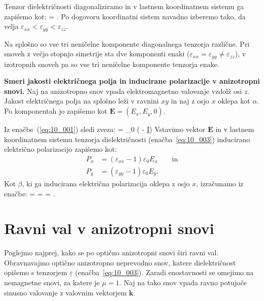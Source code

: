 Tenzor dielektričnosti diagonaliziramo in v lastnem koordinatnem 
sistemu ga zapišemo kot:
\beq
\underline{\varepsilon} = 
\!\!.
\label{eq:10_003}
\eeq
Po dogovoru koordinatni sistem navadno izberemo tako, da velja 
$\varepsilon_{xx}<\varepsilon_{yy}<\varepsilon_{zz}$.

Na splošno so vse tri neničelne komponente diagonalnega tenzorja različne. 
Pri snoveh z večjo stopnjo simetrije sta dve komponenti enaki ($\varepsilon_{xx} = 
\varepsilon_{yy} \neq \varepsilon_{zz}$), v izotropnih snoveh pa so vse tri 
neničelne komponente tenzorja enake. 

\begin{example}{\bf Smeri jakosti električnega polja 
in inducirane polarizacije v anizotropni snovi.}
Naj na anizotropno snov vpada elektromagnetno valovanje vzdolž osi $z$. Jakost
električnega polja na splošno leži v ravnini $xy$ in naj z osjo $x$ oklepa kot $\alpha$. 
Po komponentah jo zapišemo kot $\mathbf{E} = (E_x, E_y, 0)$. 

Iz enačbe~(\ref{eq:10_001}) sledi zveza:
\beq
{} = \varepsilon_0 \left(\underline{\varepsilon} - \underline{I}\right)
\label{eq:10_004}
\eeq
Vstavimo vektor $\mathbf{E}$ in v lastnem koordinatnem sistemu tenzorja 
dielektričnosti (enačba~\ref{eq:10_003}) inducirano električno polarizacijo zapišemo kot:
\begin{align}
P_x &= (\varepsilon_{xx}-1) \varepsilon_0 E_x \qquad \mathrm{in} \label{eq:10_005}\\
P_y &= (\varepsilon_{yy}-1) \varepsilon_0 E_y.
\label{eq:10_006}
\end{align}
Kot $\beta$, ki ga inducirana električna polarizacija oklepa z osjo $x$, izračunamo iz enačbe:
\beq
\tan \beta =  = 
 = \tan \alpha.
\eeq
\end{example}

\section{Ravni val v anizotropni snovi}
Poglejmo najprej, kako se po optično anizotropni snovi širi ravni val. 
Obravnavajmo optično anizotropno neprevodno snov, katere dielektričnost 
opišemo s tenzorjem $\underline{\varepsilon}$ (enačba~\ref{eq:10_003}). 
Zaradi enostavnosti se omejimo na nemagnetne snovi, za katere je $\mu = 1$. 
Naj na tako snov vpada ravno potujoče sinusno valovanje z 
valovnim vektorjem $\mathbf{k}$.  

